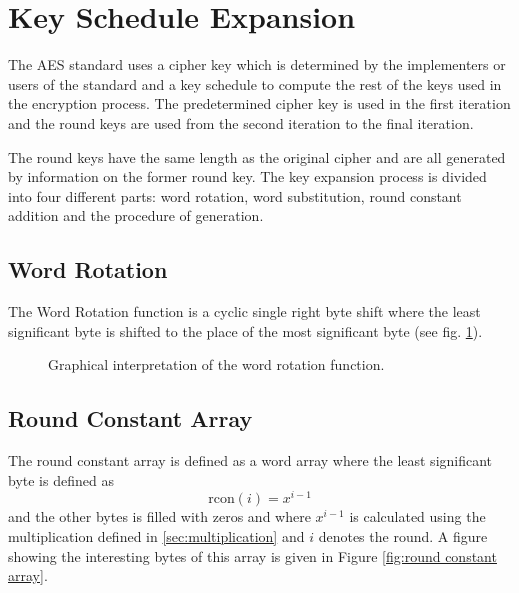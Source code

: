 \documentclass[report.tex]{subfiles}
\begin{document}
\section{Key Schedule Expansion} \label{key schedule}

The AES standard uses a cipher key which is determined by the implementers or users of the standard and a key schedule to compute the rest of the keys used in the encryption process. %
The predetermined cipher key is used in the first iteration and the round keys are used from the second iteration to the final iteration.

The round keys have the same length as the original cipher and are all generated by information on the former round key. The key expansion process is divided into four different parts: word rotation, word substitution, round constant addition and the procedure of generation.

\subsection{Word Rotation}
The Word Rotation function is a cyclic single right byte shift where the least significant byte is shifted to the place of the most significant byte (see fig. \ref{fig:word shift}).

\begin{figure}[ht]
\setlength{\unitlength}{1.0cm}
	\begin{center}
	\end{center}
	\caption{Graphical interpretation of the word rotation function.}
	\label{fig:word shift}
\end{figure}

\subsection{Round Constant Array}
The round constant array is defined as a word array where the least significant byte is defined as
\begin{equation}
	\textrm{rcon}\left(i\right) = x^{i - 1}
\end{equation}
and the other bytes is filled with zeros and where $x^{i - 1}$ is calculated using the multiplication defined in  \ref{sec:multiplication} and $i$ denotes the round. A figure showing the interesting bytes of this array is given in Figure \ref{fig:round constant array}.
\end{document}
